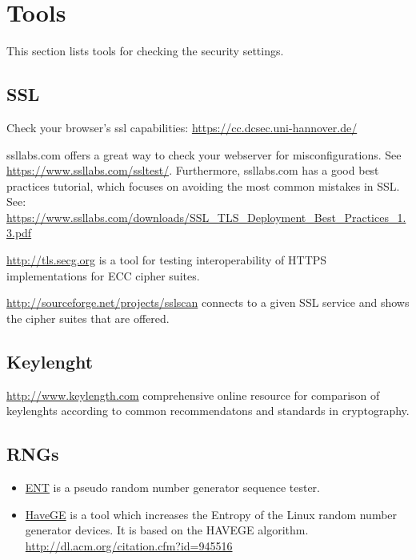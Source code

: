 \section{Tools}

This section lists tools for checking the security settings.

\subsection{SSL}

Check your browser's ssl capabilities: \url{https://cc.dcsec.uni-hannover.de/}


ssllabs.com offers a great way to check your webserver for misconfigurations. See \url{https://www.ssllabs.com/ssltest/}.
Furthermore, ssllabs.com has a good best practices tutorial, which focuses on avoiding the most common mistakes in SSL.
See: \url{https://www.ssllabs.com/downloads/SSL_TLS_Deployment_Best_Practices_1.3.pdf}

\url{http://tls.secg.org} is a tool for testing interoperability of HTTPS implementations for ECC cipher suites.

\url{http://sourceforge.net/projects/sslscan} connects to a given SSL
service and shows the cipher suites that are offered.

\subsection{Keylenght}

\url{http://www.keylength.com} comprehensive online resource for comparison of keylenghts according to common recommendatons and standards in cryptography.

\subsection{RNGs}

\begin{itemize}
\item \href{http://www.fourmilab.ch/random/}{ENT} is a pseudo random number generator sequence tester.  
\item \href{http://www.issihosts.com/haveged/}{HaveGE} is a tool which increases the Entropy of the Linux random number generator devices. It is based on the HAVEGE algorithm. \url{http://dl.acm.org/citation.cfm?id=945516}
\end{itemize}




